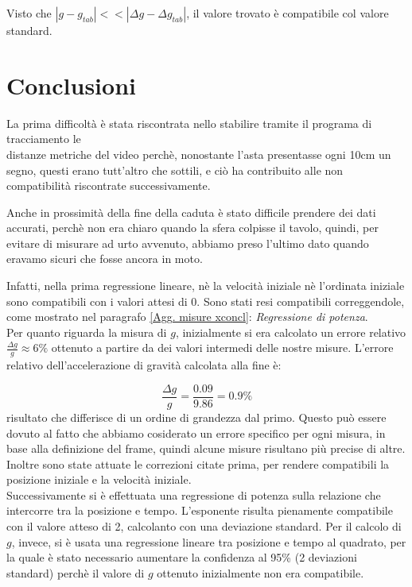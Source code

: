 \documentclass[12pt, a4paper]{article}
\begin{document}
Visto che $|g-g_{tab}|<< |\Delta g-\Delta g_{tab}|$, il valore trovato è compatibile col valore standard.



\section{Conclusioni}
La prima difficoltà è stata riscontrata nello stabilire tramite il programa di tracciamento le \\
distanze metriche del video perchè, nonostante l'asta presentasse ogni 10cm un segno, questi erano tutt'altro che sottili, e ciò ha contribuito alle non compatibilità riscontrate successivamente. 

Anche in prossimità della fine della caduta è stato difficile prendere dei dati accurati, perchè non era chiaro quando la sfera colpisse il tavolo, quindi, per evitare di misurare ad urto avvenuto, abbiamo preso l'ultimo dato quando eravamo sicuri che fosse ancora in moto.

Infatti, nella prima regressione lineare, nè la velocità iniziale nè l'ordinata iniziale sono compatibili con i valori attesi di 0. Sono stati resi compatibili correggendole, come mostrato nel paragrafo \ref{Agg. misure xconcl}: \textit{Regressione di potenza}.\\

Per quanto riguarda la misura di $g$, inizialmente si era calcolato un errore relativo $\frac{\Delta g}{g}\approx 6\% $ ottenuto a partire da dei valori intermedi delle nostre misure. L'errore relativo dell'accelerazione di gravità calcolata alla fine è:

\begin{equation*}
    \frac{\Delta g}{g}=\frac{0.09}{9.86}=0.9\%
\end{equation*}
risultato che differisce di un ordine di grandezza dal primo. Questo può essere dovuto al fatto che abbiamo cosiderato un errore specifico per ogni misura, in base alla definizione del frame, quindi alcune misure risultano più precise di altre. Inoltre sono state attuate le correzioni citate prima, per rendere compatibili  la posizione iniziale e la velocità iniziale. \\


Successivamente si è effettuata una regressione di potenza sulla relazione che intercorre tra la posizione e tempo. L'esponente risulta pienamente compatibile con il valore atteso di 2, calcolanto con una deviazione standard.
Per il calcolo di $g$, invece, si è usata una regressione lineare tra posizione e tempo al quadrato, per la quale è stato necessario aumentare la confidenza al 95\% (2 deviazioni standard) perchè il valore di $g$ ottenuto inizialmente non era compatibile. \\
\end{document}
